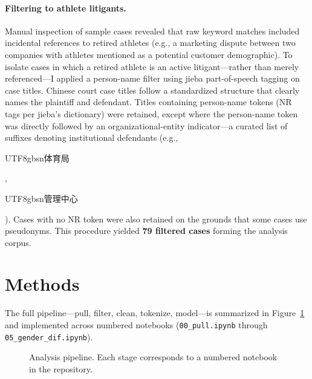 \documentclass[10pt,letterpaper]{article}
\begin{document}
\paragraph{Filtering to athlete litigants.}
Manual inspection of sample cases revealed that raw keyword matches included incidental references to retired athletes (e.g., a marketing dispute between two companies with athletes mentioned as a potential customer demographic). To isolate cases in which a retired athlete is an active litigant---rather than merely referenced---I applied a person-name filter using jieba part-of-speech tagging \citep{jieba} on case titles. Chinese court case titles follow a standardized structure that clearly names the plaintiff and defendant. Titles containing person-name tokens (NR tags per jieba's dictionary) were retained, except where the person-name token was directly followed by an organizational-entity indicator---a curated list of suffixes denoting institutional defendants (e.g., \begin{CJK}{UTF8}{gbsn}体育局\end{CJK}, \begin{CJK}{UTF8}{gbsn}管理中心\end{CJK}). Cases with no NR token were also retained on the grounds that some cases use pseudonyms. This procedure yielded \textbf{79 filtered cases} forming the analysis corpus.

\section{Methods}

The full pipeline---pull, filter, clean, tokenize, model---is summarized in Figure~\ref{fig:pipeline} and implemented across numbered notebooks (\texttt{00\_pull.ipynb} through \texttt{05\_gender\_dif.ipynb}).

\begin{figure}[H]
\centering
{}
\caption{Analysis pipeline. Each stage corresponds to a numbered notebook in the repository.}
\label{fig:pipeline}
\end{figure}
\end{document}

